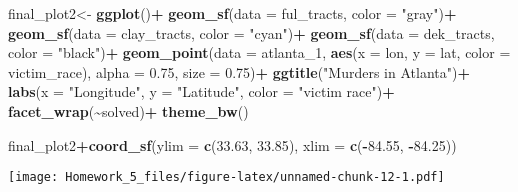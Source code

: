 \documentclass[
]{article}
\newenvironment{Shaded}{\begin{snugshade}}{\end{snugshade}}
\newcommand{\AttributeTok}[1]{\textcolor[rgb]{0.13,0.29,0.53}{#1}}
\newcommand{\FloatTok}[1]{\textcolor[rgb]{0.00,0.00,0.81}{#1}}
\newcommand{\FunctionTok}[1]{\textcolor[rgb]{0.13,0.29,0.53}{\textbf{#1}}}
\newcommand{\NormalTok}[1]{#1}
\newcommand{\OtherTok}[1]{\textcolor[rgb]{0.56,0.35,0.01}{#1}}
\newcommand{\SpecialCharTok}[1]{\textcolor[rgb]{0.81,0.36,0.00}{\textbf{#1}}}
\newcommand{\StringTok}[1]{\textcolor[rgb]{0.31,0.60,0.02}{#1}}
\begin{document}
\begin{Shaded}
\begin{Highlighting}[]
\NormalTok{final\_plot2}\OtherTok{\textless{}{-}} \FunctionTok{ggplot}\NormalTok{()}\SpecialCharTok{+}
  \FunctionTok{geom\_sf}\NormalTok{(}\AttributeTok{data =}\NormalTok{ ful\_tracts, }\AttributeTok{color =} \StringTok{"gray"}\NormalTok{)}\SpecialCharTok{+}
  \FunctionTok{geom\_sf}\NormalTok{(}\AttributeTok{data =}\NormalTok{ clay\_tracts, }\AttributeTok{color =} \StringTok{"cyan"}\NormalTok{)}\SpecialCharTok{+}
  \FunctionTok{geom\_sf}\NormalTok{(}\AttributeTok{data =}\NormalTok{ dek\_tracts, }\AttributeTok{color =} \StringTok{"black"}\NormalTok{)}\SpecialCharTok{+}
  \FunctionTok{geom\_point}\NormalTok{(}\AttributeTok{data =}\NormalTok{ atlanta\_1, }\FunctionTok{aes}\NormalTok{(}\AttributeTok{x =}\NormalTok{ lon, }\AttributeTok{y =}\NormalTok{ lat, }\AttributeTok{color =}\NormalTok{ victim\_race), }\AttributeTok{alpha =} \FloatTok{0.75}\NormalTok{, }\AttributeTok{size =} \FloatTok{0.75}\NormalTok{)}\SpecialCharTok{+}
  \FunctionTok{ggtitle}\NormalTok{(}\StringTok{"Murders in Atlanta"}\NormalTok{)}\SpecialCharTok{+}
  \FunctionTok{labs}\NormalTok{(}\AttributeTok{x =} \StringTok{"Longitude"}\NormalTok{, }\AttributeTok{y =} \StringTok{"Latitude"}\NormalTok{, }\AttributeTok{color =} \StringTok{"victim race"}\NormalTok{)}\SpecialCharTok{+}
  \FunctionTok{facet\_wrap}\NormalTok{(}\SpecialCharTok{\textasciitilde{}}\NormalTok{solved)}\SpecialCharTok{+}
  \FunctionTok{theme\_bw}\NormalTok{()}


\NormalTok{final\_plot2}\SpecialCharTok{+}\FunctionTok{coord\_sf}\NormalTok{(}\AttributeTok{ylim =} \FunctionTok{c}\NormalTok{(}\FloatTok{33.63}\NormalTok{, }\FloatTok{33.85}\NormalTok{), }\AttributeTok{xlim =} \FunctionTok{c}\NormalTok{(}\SpecialCharTok{{-}}\FloatTok{84.55}\NormalTok{, }\SpecialCharTok{{-}}\FloatTok{84.25}\NormalTok{))}
\end{Highlighting}
\end{Shaded}

\texttt{[image: Homework\_5\_files/figure-latex/unnamed-chunk-12-1.pdf]}
\end{document}
